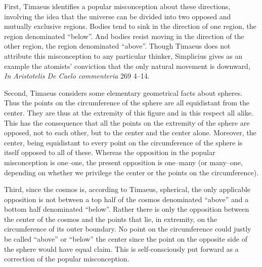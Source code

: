 First, Timaeus identifies a popular misconception about these directions, involving the idea that the universe can be divided into two opposed and mutually exclusive regions. Bodies tend to sink in the direction of one region, the region denominated ``below''. And bodies resist moving in the direction of the other region, the region denominated ``above''. Though Timaeus does not attribute this misconception to any particular thinker, Simplicius gives as an example the atomists' conviction that the only natural movement is downward, \emph{In Aristotelis De Caelo commenteria} 269 4--14.

Second, Timaeus considers some elementary geometrical facts about spheres. Thus the points on the circumference of the sphere are all equidistant from the center. They are thus at the extremity of this figure and in this respect all alike. This has the consequence that all the points on the extremity of the sphere are opposed, not to each other, but to the center and the center alone. Moreover, the center, being equidistant to every point on the circumference of the sphere is itself opposed to all of these. Whereas the opposition in the popular misconception is one--one, the present opposition is one--many (or many--one, depending on whether we privilege the center or the points on the circumference).

Third, since the cosmos is, according to Timaeus, spherical, the only applicable opposition is not between a top half of the cosmos denominated ``above'' and a bottom half denominated ``below''. Rather there is only the opposition between the center of the cosmos and the points that lie, in extremity, on the circumference of its outer boundary. No point on the circumference could justly be called ``above'' or ``below'' the center since the point on the opposite side of the sphere would have equal claim. This is self-consciously put forward as a correction of the popular misconception.

